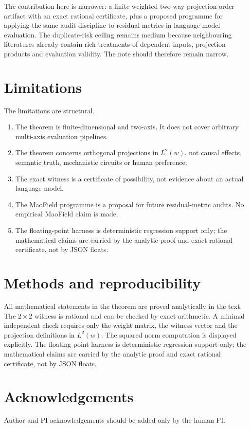 \documentclass[11pt]{article}
\theoremstyle{remark}
\begin{document}
The contribution here is narrower: a finite weighted two-way projection-order artifact with an exact rational certificate, plus a proposed programme for applying the same audit discipline to residual metrics in language-model evaluation. The duplicate-risk ceiling remains medium because neighbouring literatures already contain rich treatments of dependent inputs, projection products and evaluation validity. The note should therefore remain narrow.

\section{Limitations}

The limitations are structural.
\begin{enumerate}[leftmargin=*,itemsep=2pt]
\item The theorem is finite-dimensional and two-axis. It does not cover arbitrary multi-axis evaluation pipelines.
\item The theorem concerns orthogonal projections in $L^2(w)$, not causal effects, semantic truth, mechanistic circuits or human preference.
\item The exact witness is a certificate of possibility, not evidence about an actual language model.
\item The MaoField programme is a proposal for future residual-metric audits. No empirical MaoField claim is made.
\item The floating-point harness is deterministic regression support only; the mathematical claims are carried by the analytic proof and exact rational certificate, not by JSON floats.
\end{enumerate}

\section{Methods and reproducibility}

All mathematical statements in the theorem are proved analytically in the text. The $2\times2$ witness is rational and can be checked by exact arithmetic. A minimal independent check requires only the weight matrix, the witness vector and the projection definitions in $L^2(w)$. The squared norm computation is displayed explicitly. The floating-point harness is deterministic regression support only; the mathematical claims are carried by the analytic proof and exact rational certificate, not by JSON floats.

\section*{Acknowledgements}
Author and PI acknowledgements should be added only by the human PI.
\end{document}

